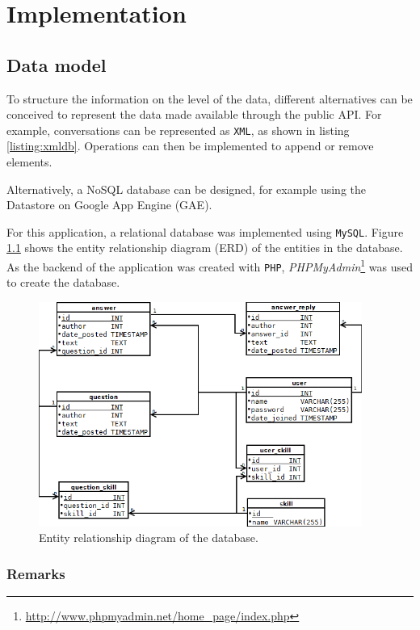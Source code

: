 \chapter{Implementation}\label{chapter:implementation}

\section{Data model}\label{section:datamodel}

To structure the information on the level of the data, different alternatives can be conceived to represent the data made available through the public API. For example, conversations can be represented as \texttt{XML}, as shown in listing \ref{listing:xmldb}. Operations can then be implemented to append or remove elements.

%

Alternatively, a NoSQL database can be designed, for example using the Datastore on Google App Engine (GAE).

For this application, a relational database was implemented using \texttt{MySQL}. Figure \ref{figure:erd} shows the entity relationship diagram (ERD) of the entities in the database. As the backend of the application was created with \texttt{PHP}, \emph{PHPMyAdmin}\footnote{\url{http://www.phpmyadmin.net/home_page/index.php}} was used to create the database.

\begin{figure}
	\includegraphics[width=400px]{img/erd}
	\caption{Entity relationship diagram of the database.}
	\label{figure:erd}
\end{figure}

\subsection{Remarks}

